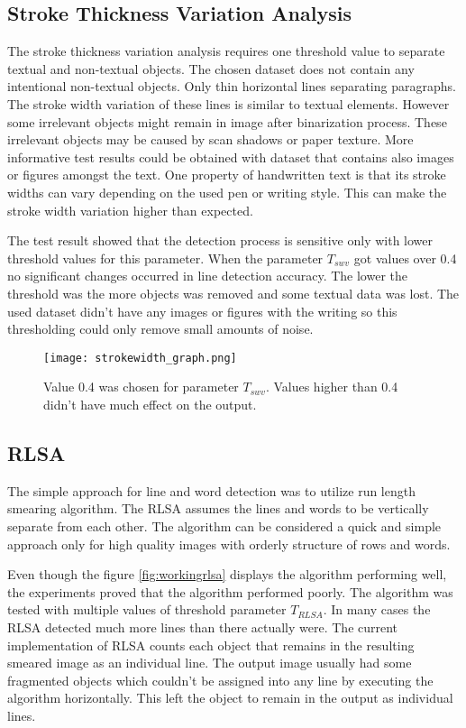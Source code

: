 \documentclass{article}
\begin{document}
    \subsection{Stroke Thickness Variation Analysis}
      The stroke thickness variation analysis requires one threshold value to separate textual and non-textual objects. The chosen dataset does not contain any intentional non-textual objects. Only thin horizontal lines separating paragraphs. The stroke width variation of these lines is similar to textual elements. However some irrelevant objects might remain in image after binarization process. These irrelevant objects may be caused by scan shadows or paper texture. More informative test results could be obtained with dataset that contains also images or figures amongst the text. One property of handwritten text is that its stroke widths can vary depending on the used pen or writing style. This can make the stroke width variation higher than expected.

      The test result showed that the detection process is sensitive only with lower threshold values for this parameter. When the parameter $T_{swv}$ got values over 0.4 no significant changes occurred in line detection accuracy. The lower the threshold was the more objects was removed and some textual data was lost. The used dataset didn't have any images or figures with the writing so this thresholding could only remove small amounts of noise.

      \begin{figure}[!ht]
        \centering
        \texttt{[image: strokewidth\_graph.png]}
        \caption{Value 0.4 was chosen for parameter $T_{swv}$. Values higher than 0.4 didn't have much effect on the output. \label{fig:strokewidthresults}}
      \end{figure}

    \subsection{RLSA}
      The simple approach for line and word detection was to utilize run length smearing algorithm. The RLSA assumes the lines and words to be vertically separate from each other. The algorithm can be considered a quick and simple approach only for high quality images with orderly structure of rows and words.

      Even though the figure \ref{fig:workingrlsa} displays the algorithm performing well, the experiments proved that the algorithm performed poorly. The algorithm was tested with multiple values of threshold parameter $T_{RLSA}$. In many cases the RLSA detected much more lines than there actually were. The current implementation of RLSA counts each object that remains in the resulting smeared image as an individual line. The output image usually had some fragmented objects which couldn't be assigned into any line by executing the algorithm horizontally. This left the object to remain in the output as individual lines.
\end{document}
